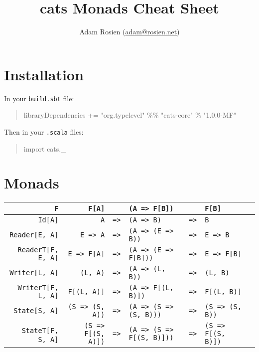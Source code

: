 \documentclass{tufte-handout}
\title{cats Monads Cheat Sheet}
\author[Adam Rosien]{Adam Rosien (\href{mailto:adam@rosien.net}{adam@rosien.net})}
\newcommand{\fa}{F[A]}
\newcommand{\fb}{F[B]}
\newcommand{\rarr}{\texttt{=>}}
\newcommand{\fThree}[3]{\texttt{#1} & \rarr & \texttt{#2} & \rarr & \texttt{#3}}
\begin{document}
\maketitle%

\section{Installation}\label{sec:installation}

\noindent In your \texttt{build.sbt} file:

\begin{quote}
  \ttfamily libraryDependencies += "org.typelevel" \%\% "cats-core" \% "1.0.0-MF"
\end{quote}

\noindent Then in your \texttt{.scala} files:

\begin{quote}
  \ttfamily import cats.\_
\end{quote}

\section{Monads}

\begin{table}[ht]
  \centering
  \selectfont
  \setlength{\tabcolsep}{5pt}
  \begin{tabular}{rrrlcll}
    \texttt{F} & \texttt{\fa} &  & \texttt{(A => \fb)} & & \texttt{\fb} \\
    \midrule
    \texttt{Id[A]}               & \fThree{A}{(A => B)}{B} \\
    \texttt{Reader[E, A]}      & \fThree{E => A}{(A => (E => B))}{E => B} \\
    \texttt{ReaderT[F, E, A]}      & \fThree{E => F[A]}{(A => (E => F[B]))}{E => F[B]} \\
    \texttt{Writer[L, A]}        & \fThree{(L, A)}{(A => (L, B))}{(L, B)} \\
    \texttt{WriterT[F, L, A]}        & \fThree{F[(L, A)]}{(A => F[(L, B)])}{F[(L, B)]} \\
    \texttt{State[S, A]}         & \fThree{(S =>  (S, A))}{(A => (S => (S, B)))}{(S => (S, B))} \\   \
    \texttt{StateT[F, S, A]}         & \fThree{(S =>  F[(S, A)])}{(A => (S => F[(S, B)]))}{(S => F[(S, B)])} \\

  \end{tabular}
  \label{tab:normaltab}
\end{table}
\end{document}
